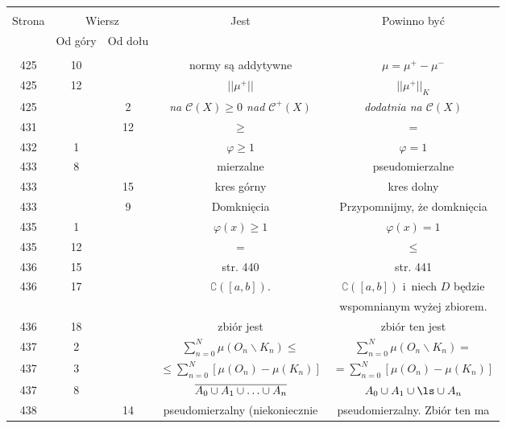 \documentclass[a4paper,11pt]{article}
\newcommand{\ld}{\ldots}
\newcommand{\bs}{\backslash}
\begin{document}
\begin{center}
  \begin{tabular}{|c|c|c|c|c|}
    \hline
    & \multicolumn{2}{c|}{} & & \\
    Strona & \multicolumn{2}{c|}{Wiersz}& Jest & Powinno być \\ \cline{2-3}
    & Od góry & Od dołu &  &  \\ \hline
    & & & & \\
    425 & 10 & & normy są addytywne & $\mu = \mu^{ + } - \mu^{ - }$ \\
    425 & 12 & & $|| \mu^{ + } ||$ & $|| \mu^{ + } ||_{ K }$ \\
    425 & & 2 & \emph{na $\mathcal{C}( X ) \geq 0$ nad
                $\mathcal{C}^{ + }( X )$} 
           & \emph{dodatnia na $\mathcal{C}( X )$} \\
    431 & & 12 & $\geq$ & $=$ \\
    432 & 1 & & $\varphi \geq 1$ & $\varphi = 1$ \\
    433 & 8 & & mierzalne & pseudomierzalne \\
    433 & & 15 & kres górny & kres dolny \\
    433 & & 9 & Domknięcia & Przypomnijmy, że domknięcia \\
    435 & 1 & & $\varphi( x ) \geq 1$ & $\varphi( x ) = 1$ \\
    435 & 12 & & $=$ & $\leq$ \\
    436 & 15 & & str. 440 & str. 441 \\
    436 & 17 & & $\complement ( [ a, b ] )$. & $\complement ( [ a, b ] )$
                                               i~niech $D$ będzie \\
    & & & & wspomnianym wyżej zbiorem. \\
    436 & 18 & & zbiór jest & zbiór ten jest \\
    437 & 2 & & $\sum\limits^{ N }_{ n = 0 } \mu( O_{ n } \bs
                K_{ n } ) \leq$ & $\sum\limits^{ N }_{ n = 0 }
                                  \mu( O_{ n } \backslash K_{ n } ) =$ \\
    437 & 3 & & $\leq \sum\limits^{ N }_{ n = 0 } [ \mu( O_{ n } )
                - \mu( K_{ n } ) ]$ 
           & $= \sum\limits^{ N }_{ n = 0 } [ \mu( O_{ n } ) 
             - \mu( K_{ n } ) ]$ \\
    437 & 8 & & $\ol{ A_{ 0 } \cup A_{ 1 } \cup \ld \cup A_{ n } }$
           & $A_{ 0 } \cup A_{ 1 } \cup \ls \cup A_{ n }$ \\
    438 & & 14 & pseudomierzalny (niekoniecznie & pseudomierzalny. Zbiór
                                                  ten ma \\

\end{tabular}
\end{center}
\end{document}
